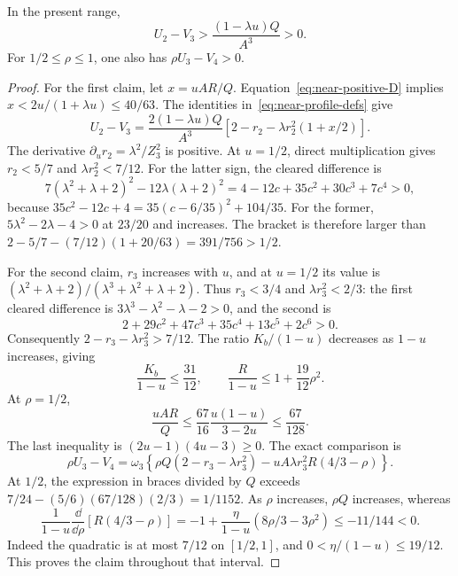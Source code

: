 \begin{lemma}\label{lem:near-age-comparisons}
In the present range,
\[
 U_2-V_3>\frac{(1-\lambda u)Q}{A^3}>0.
\]
For $1/2\le\rho\le1$, one also has $\rho U_3-V_4>0$.
\end{lemma}
\begin{proof}
For the first claim, let $x=uAR/Q$. Equation~\eqref{eq:near-positive-D} implies
$x<2u/(1+\lambda u)\le40/63$. The identities in~\eqref{eq:near-profile-defs} give
\[
 U_2-V_3=\frac{2(1-\lambda u)Q}{A^3}
      [2-r_2-\lambda r_2^2(1+x/2)].
\]
The derivative $\partial_u r_2=\lambda^2/Z_3^2$ is positive. At $u=1/2$, direct multiplication gives $r_2<5/7$ and $\lambda r_2^2<7/12$. For the latter sign, the cleared difference is
\[
 7(\lambda^2+\lambda+2)^2-12\lambda(\lambda+2)^2
 =4-12c+35c^2+30c^3+7c^4>0,
\]
because $35c^2-12c+4=35(c-6/35)^2+104/35$. For the former, $5\lambda^2-2\lambda-4>0$ at $23/20$ and increases. The bracket is therefore larger than
$2-5/7-(7/12)(1+20/63)=391/756>1/2$.

For the second claim, $r_3$ increases with $u$, and at $u=1/2$ its value is
$(\lambda^2+\lambda+2)/(\lambda^3+\lambda^2+\lambda+2)$. Thus $r_3<3/4$ and $\lambda r_3^2<2/3$: the first cleared difference is $3\lambda^3-\lambda^2-\lambda-2>0$, and the second is
\[
 2+29c^2+47c^3+35c^4+13c^5+2c^6>0.
\]
Consequently $2-r_3-\lambda r_3^2>7/12$. The ratio $K_b/(1-u)$ decreases as $1-u$ increases, giving
\begin{equation}\label{eq:near-K-ratio}
 \frac{K_b}{1-u}\le\frac{31}{12},\qquad
 \frac R{1-u}\le1+\frac{19}{12}\rho^2.
\end{equation}
At $\rho=1/2$,
\[
 \frac{uAR}{Q}\le\frac{67}{16}\frac{u(1-u)}{3-2u}\le\frac{67}{128}.
\]
The last inequality is $(2u-1)(4u-3)\ge0$. The exact comparison is
\[
 \rho U_3-V_4=\omega_3\left\{\rho Q(2-r_3-\lambda r_3^2)
             -uA\lambda r_3^2R(4/3-\rho)\right\}.
\]
At $1/2$, the expression in braces divided by $Q$ exceeds
$7/24-(5/6)(67/128)(2/3)=1/1152$. As $\rho$ increases, $\rho Q$ increases, whereas
\[
 \frac1{1-u}\frac\dd{\dd\rho}[R(4/3-\rho)]
 =-1+\frac\eta{1-u}(8\rho/3-3\rho^2)\le-11/144<0.
\]
Indeed the quadratic is at most $7/12$ on $[1/2,1]$, and $0<\eta/(1-u)\le19/12$. This proves the claim throughout that interval.
\end{proof}

